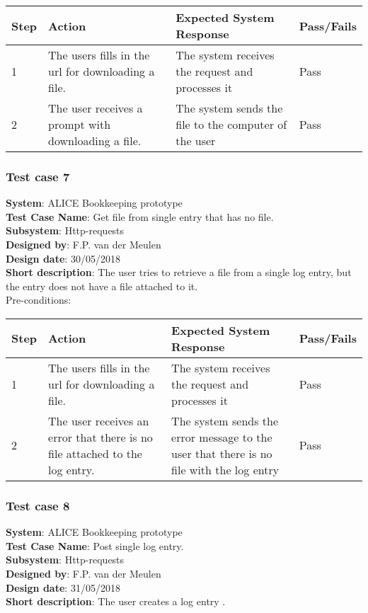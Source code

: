 \begin{longtable}{ | p{0.8cm} | p{4.5cm} | p{6cm} | p{1.5cm} |}
\hline
Step & Action & Expected System Response & Pass/Fails  \\ \hline
1 & The users fills in the url for downloading a file. & The system receives the request and processes it & Pass \\ \hline
2 & The user receives a prompt with downloading a file. & The system sends the file to the computer of the user & Pass \\ \hline
\end{longtable}
\subsubsection{Test case 7}
\textbf{System}:  ALICE Bookkeeping prototype \\
\textbf{Test Case Name}:  Get file from single entry that has no file. \\
\textbf{Subsystem}:  Http-requests \\
\textbf{Designed by}:  F.P. van der Meulen\\
\textbf{Design date}:  30/05/2018\\
\textbf{Short description}: The user tries to retrieve a file from a single log entry, but the entry does not have a file attached to it. \\ 

Pre-conditions: \\

\begin{longtable}{ | p{0.8cm} | p{4.5cm} | p{6cm} | p{1.5cm} |}
\hline
Step & Action & Expected System Response & Pass/Fails  \\ \hline
1 & The users fills in the url for downloading a file. & The system receives the request and processes it & Pass \\ \hline
2 & The user receives an error that there is no file attached to the log entry. & The system sends the error message to the user that there is no file with the log entry & Pass \\ \hline
\end{longtable}

\subsubsection{Test case 8}
\textbf{System}:  ALICE Bookkeeping prototype \\
\textbf{Test Case Name}:  Post single log entry. \\
\textbf{Subsystem}:  Http-requests \\
\textbf{Designed by}:  F.P. van der Meulen\\
\textbf{Design date}:  31/05/2018\\
\textbf{Short description}: The user creates a log entry . \\

